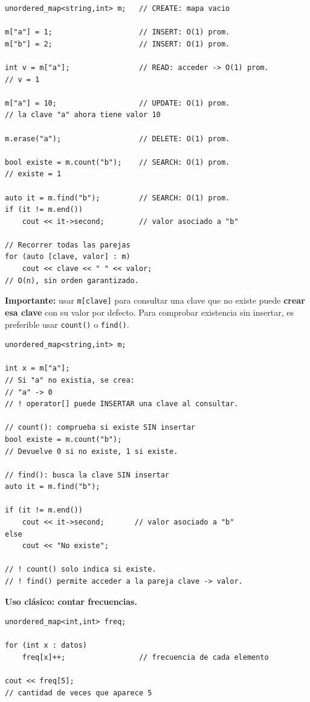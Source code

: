 \documentclass[10pt,a4paper,twocolumn]{article}
\begin{document}
\begin{lstlisting}[style=cpp]
unordered_map<string,int> m;   // CREATE: mapa vacio

m["a"] = 1;                    // INSERT: O(1) prom.
m["b"] = 2;                    // INSERT: O(1) prom.

int v = m["a"];                // READ: acceder -> O(1) prom.
// v = 1

m["a"] = 10;                   // UPDATE: O(1) prom.
// la clave "a" ahora tiene valor 10

m.erase("a");                  // DELETE: O(1) prom.

bool existe = m.count("b");    // SEARCH: O(1) prom.
// existe = 1

auto it = m.find("b");         // SEARCH: O(1) prom.
if (it != m.end())
    cout << it->second;        // valor asociado a "b"

// Recorrer todas las parejas
for (auto [clave, valor] : m)
    cout << clave << " " << valor;
// O(n), sin orden garantizado.
\end{lstlisting}

\textbf{Importante:} usar \texttt{m[clave]} para consultar una clave
que no existe puede \textbf{crear esa clave} con su valor por defecto.
Para comprobar existencia sin insertar, es preferible usar
\texttt{count()} o \texttt{find()}.

\begin{lstlisting}[style=cpp]
unordered_map<string,int> m;

int x = m["a"];
// Si "a" no existia, se crea:
// "a" -> 0
// ! operator[] puede INSERTAR una clave al consultar.

// count(): comprueba si existe SIN insertar
bool existe = m.count("b");
// Devuelve 0 si no existe, 1 si existe.

// find(): busca la clave SIN insertar
auto it = m.find("b");

if (it != m.end())
    cout << it->second;       // valor asociado a "b"
else
    cout << "No existe";

// ! count() solo indica si existe.
// ! find() permite acceder a la pareja clave -> valor.
\end{lstlisting}


\textbf{Uso clásico: contar frecuencias.}

\begin{lstlisting}[style=cpp]
unordered_map<int,int> freq;

for (int x : datos)
    freq[x]++;                 // frecuencia de cada elemento

cout << freq[5];
// cantidad de veces que aparece 5
\end{lstlisting}
\end{document}
